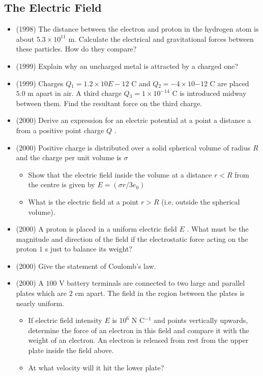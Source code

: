 \documentclass{article}
\begin{document}
\subsection{The Electric Field}
\begin{itemize}
\item (1998)  The distance between the electron and proton in the hydrogen atom is about $ 5.3 \times 10^{11}$ m. Calculate the electrical and gravitational forces between these particles. How do they compare?
\item (1999)  Explain why an uncharged metal is attracted by a charged one?
\item (1999)  Charges $ Q​_{1}=1.2 \times 10$ ​$ E-12$ C and $ Q​_{2}=-4 \times 10$ ​ $ -12$ C are placed $ 5.0$ m apart in air. A third charge $ Q​_{3}=1 \times 10^{-14}$ C is introduced midway between them. Find the resultant force on the third charge.
\item (2000)  Derive an expression for an electric potential at a point a distance a from a positive point charge $ Q$ .
\item (2000)  Positive charge is distributed over a solid spherical volume of radius $ R$ and the charge per unit volume is $ \sigma $\begin{itemize}
\item Show that the electric field inside the volume at a distance $ r<R$ from the centre is given by $ E=(\sigma r/3e_{0})$
\item What is the electric field at a point $ r>R$ (i.e. outside the spherical volume).
\end{itemize}
\item (2000)  A proton is placed in a uniform electric field $ E$ . What must be the magnitude and direction of the field if the electrostatic force acting on the proton $ 1$ s just to balance its weight?
\item (2000)  Give the statement of Coulomb’s law.
\item (2000)  A $ 100$ V battery terminals are connected to two large and parallel plates which are $ 2$ cm apart. The field in the region between the plates is nearly uniform. \begin{itemize}
\item If electric field intensity $ E$ is $ 10^{6}$ N C$ ^{-1}$ and points vertically upwards, determine the force of an electron in this field and compare it with the weight of an electron. An electron is released from rest from the upper plate inside the field above.
\item At what velocity will it hit the lower plate?

\end{itemize}
\end{itemize}
\end{document}
